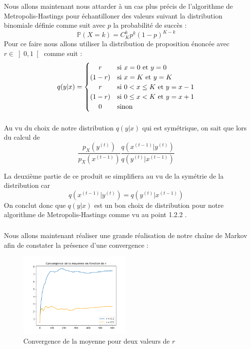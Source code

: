 Nous allons maintenant nous attarder à un cas plus précis de l'algorithme de Metropolis-Hastings pour échantilloner des valeurs suivant la 
distribution binomiale définie comme suit avec $p$ la probabilité de succès :
\begin{equation*}
  \mathbb{P}(X = k) = C_K^k p^k(1-p)^{K-k}
\end{equation*}
Pour ce faire nous allons utiliser la distribution de proposition énoncée avec \(r \in \left] 0, 1\right[\) comme suit :
\begin{equation*}
  q(y|x) = 
  \begin{cases}
    \hfil r & \text{si } x = 0 \text{ et } y = 0\\
    \hfil (1-r) &  \text{si } x = K \text{ et } y = K\\
    \hfil r & \text{si } 0 < x \leq K \text{ et } y = x - 1\\
    \hfil (1-r) & \text{si } 0 \leq x < K \text{ et } y = x + 1\\
    \hfil 0 & \text{sinon}
  \end{cases}
\end{equation*}

\subsubsection{}
Au vu du choix de notre distribution $q(y|x)$ qui est symétrique, on sait que lors du calcul de 
\begin{equation*}
  \frac{p_X(y^{(t)})}{p_X(x^{(t-1)})} \frac{q(x^{(t-1)}|y^{(t)})}{q(y^{(t)}|x^{(t-1)})}
\end{equation*}

La deuxième partie de ce produit se simplifiera au vu de la symétrie de la distribution car
\begin{equation*}
  q(x^{(t-1)}|y^{(t)}) = q(y^{(t)}|x^{(t-1)})
\end{equation*}
On conclut donc que $q(y|x)$ est un bon choix de distribution pour notre algorithme de Metropolis-Hastings comme vu au point 1.2.2 .

\subsubsection{}
Nous allons maintenant réaliser une grande réalisation de notre chaîne de Markov afin de constater la présence d'une convergence :

\begin{figure}[H]
  \centering
  \includegraphics[width=0.5\textwidth]{figs/convergence_mean.png}
  \caption{Convergence de la moyenne pour deux valeurs de $r$}
\end{figure}

